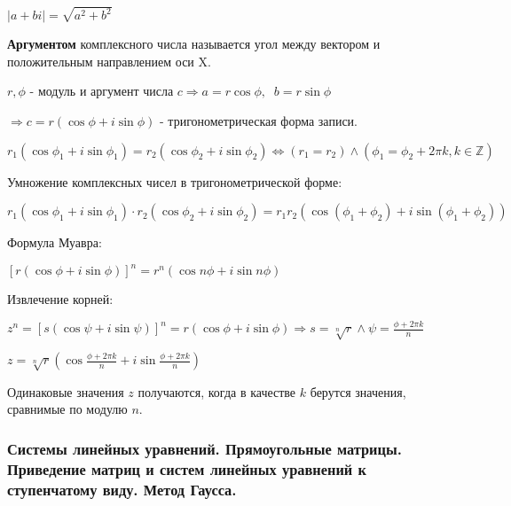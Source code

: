 \documentclass{article}
\begin{document}
$|a + b i| = \sqrt{a^2 + b^2}$

\textbf{Аргументом} комплексного числа называется угол между вектором и положительным
направлением оси X.

$r, \phi$ - модуль и аргумент числа $c \Rightarrow a = r \cos \phi, \;\; b = r \sin \phi$

$\Rightarrow c = r (\cos \phi + i \sin\phi)$ - тригонометрическая форма записи.

$r_1(\cos \phi_1 + i \sin\phi_1) = r_2(\cos \phi_2 + i \sin \phi_2) \iff
(r_1 = r_2) \wedge (\phi_1 = \phi_2 + 2 \pi k, k \in \mathbb{Z})$

Умножение комплексных чисел в тригонометрической форме:

$r_1(\cos \phi_1 + i \sin\phi_1) \cdot r_2 (\cos \phi_2 + i \sin\phi_2) =
r_1 r_2 (\cos(\phi_1 + \phi_2) + i \sin (\phi_1 + \phi_2))$

Формула Муавра:

$[r(\cos\phi + i \sin\phi)]^n = r^n (\cos n\phi + i \sin n\phi)$

Извлечение корней:

$z^n = [s(\cos\psi + i \sin\psi)]^n = r (\cos \phi + i\sin\phi) \Rightarrow
s = \sqrt[n]{r} \wedge \psi = \frac{\phi + 2 \pi k}{n}$

$z = \sqrt[n]{r}(\cos\frac{\phi + 2 \pi k}{n} + i \sin\frac{\phi + 2 \pi k}{n})$

Одинаковые значения $z$ получаются, когда в качестве $k$ берутся значения,
сравнимые по модулю $n$.

\subsubsection{Системы линейных уравнений. Прямоугольные матрицы. Приведение матриц и систем
линейных уравнений к ступенчатому виду. Метод Гаусса.}
\end{document}
